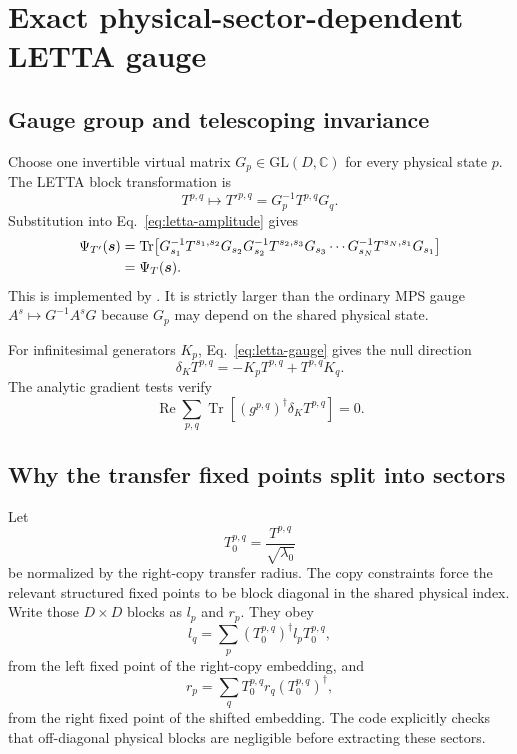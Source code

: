 \documentclass[11pt]{article}
\newcommand{\CC}{\mathbb{C}}
\newcommand{\Tr}{\operatorname{Tr}}
\newcommand{\RePart}{\operatorname{Re}}
\newcommand{\code}[1]{\texttt{\detokenize{#1}}}
\begin{document}
\section{Exact physical-sector-dependent LETTA gauge}
\label{sec:conditional-gauge}

\subsection{Gauge group and telescoping invariance}

Choose one invertible virtual matrix $G_p\in\mathrm{GL}(D,\CC)$ for every
physical state $p$.  The LETTA block transformation is
\begin{equation}
  T^{p,q}\longmapsto T'^{p,q}
  =G_p^{-1}T^{p,q}G_q.
  \label{eq:letta-gauge}
\end{equation}
Substitution into Eq.~\eqref{eq:letta-amplitude} gives
\begin{align}
  \Psi_{T'}(\bm{s})
  &=\Tr\!\left[
    G_{s_1}^{-1}T^{s_1,s_2}G_{s_2}
    G_{s_2}^{-1}T^{s_2,s_3}G_{s_3}\cdots
    G_{s_N}^{-1}T^{s_N,s_1}G_{s_1}
  \right]
  \notag\\
  &=\Psi_T(\bm{s}).
  \label{eq:gauge-telescope}
\end{align}
This is implemented by \code{UniformLETTA.gauge_transform}.  It is strictly
larger than the ordinary MPS gauge $A^s\mapsto G^{-1}A^sG$ because $G_p$ may
depend on the shared physical state.

For infinitesimal generators $K_p$, Eq.~\eqref{eq:letta-gauge} gives the null
direction
\begin{equation}
  \delta_K T^{p,q}=-K_pT^{p,q}+T^{p,q}K_q.
  \label{eq:infinitesimal-gauge}
\end{equation}
The analytic gradient tests verify
\begin{equation}
  \RePart\sum_{p,q}\Tr\!\left[(g^{p,q})^\dagger
  \delta_KT^{p,q}\right]=0.
  \label{eq:gradient-gauge-null}
\end{equation}

\subsection{Why the transfer fixed points split into sectors}

Let
\begin{equation}
  T_0^{p,q}=\frac{T^{p,q}}{\sqrt{\lambda_0}}
  \label{eq:T0}
\end{equation}
be normalized by the right-copy transfer radius.  The copy constraints force
the relevant structured fixed points to be block diagonal in the shared
physical index.  Write those $D\times D$ blocks as $l_p$ and $r_p$.  They obey
\begin{equation}
  l_q=\sum_p(T_0^{p,q})^\dagger l_pT_0^{p,q},
  \label{eq:left-sector-fixed}
\end{equation}
from the left fixed point of the right-copy embedding, and
\begin{equation}
  r_p=\sum_qT_0^{p,q}r_q(T_0^{p,q})^\dagger,
  \label{eq:right-sector-fixed}
\end{equation}
from the right fixed point of the shifted embedding.  The code explicitly
checks that off-diagonal physical blocks are negligible before extracting
these sectors.
\end{document}
